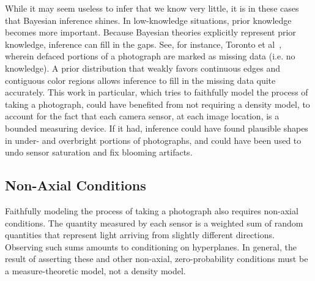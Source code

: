 While it may seem useless to infer that we know very little, it is in these cases that Bayesian inference shines.
In low-knowledge situations, prior knowledge becomes more important.
Because Bayesian theories explicitly represent prior knowledge, inference can fill in the gaps.
See, for instance, Toronto et al~\cite{cit:toronto-2009cvpr}, wherein defaced portions of a photograph are marked as missing data (i.e. no knowledge).
A prior distribution that weakly favors continuous edges and contiguous color regions allows inference to fill in the missing data quite accurately.
This work in particular, which tries to faithfully model the process of taking a photograph, could have benefited from not requiring a density model, to account for the fact that each camera sensor, at each image location, is a bounded measuring device.
If it had, inference could have found plausible shapes in under- and overbright portions of photographs, and could have been used to undo sensor saturation and fix blooming artifacts.


\subsection{Non-Axial Conditions}

Faithfully modeling the process of taking a photograph also requires non-axial conditions.
The quantity measured by each sensor is a weighted sum of random quantities that represent light arriving from slightly different directions.
Observing such sums amounts to conditioning on hyperplanes.
In general, the result of asserting these and other non-axial, zero-probability conditions must be a measure-theoretic model, not a density model.

